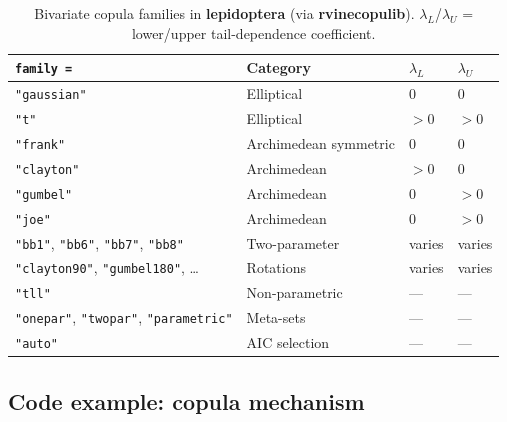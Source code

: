\documentclass[12pt,a4paper]{article}
\newcommand{\pkg}[1]{\textbf{#1}}
\newcommand{\code}[1]{\texttt{#1}}
\begin{document}
\begin{table}[ht]
\centering
\caption{Bivariate copula families in \pkg{lepidoptera} (via \pkg{rvinecopulib}).
$\lambda_L$/$\lambda_U$ = lower/upper tail-dependence coefficient.}
\label{tab:copula_families}
\small
\begin{tabular}{llll}
\toprule
\code{family =} & Category & $\lambda_L$ & $\lambda_U$ \\
\midrule
\code{"gaussian"} & Elliptical & 0 & 0 \\
\code{"t"} & Elliptical & $>0$ & $>0$ \\
\code{"frank"} & Archimedean symmetric & 0 & 0 \\
\code{"clayton"} & Archimedean & $>0$ & 0 \\
\code{"gumbel"} & Archimedean & 0 & $>0$ \\
\code{"joe"} & Archimedean & 0 & $>0$ \\
\code{"bb1"}, \code{"bb6"}, \code{"bb7"}, \code{"bb8"} & Two-parameter & varies & varies \\
\code{"clayton90"}, \code{"gumbel180"}, \ldots & Rotations & varies & varies \\
\code{"tll"} & Non-parametric & --- & --- \\
\code{"onepar"}, \code{"twopar"}, \code{"parametric"} & Meta-sets & --- & --- \\
\code{"auto"} & AIC selection & --- & --- \\
\bottomrule
\end{tabular}
\end{table}

\subsection{Code example: copula mechanism}
\label{sec:copula_code}
\end{document}
